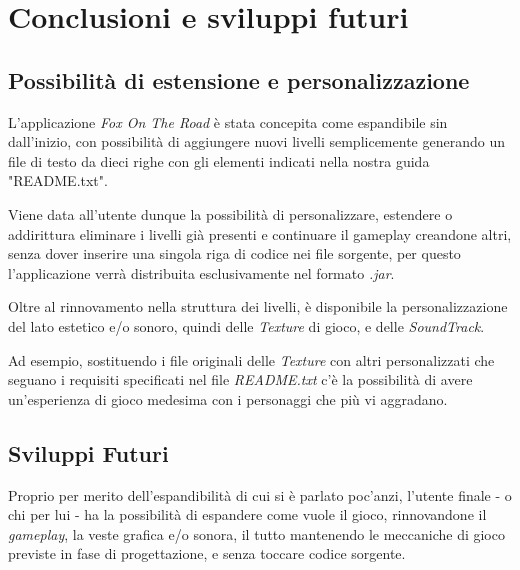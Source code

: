 \documentclass[12pt,a4paper]{report}
\begin{document}
\chapter{Conclusioni e sviluppi futuri}\label{ch:conc-svil-fut}

\section{Possibilità di estensione e personalizzazione}
L'applicazione \emph{Fox On The Road} è stata concepita come espandibile sin dall'inizio, con possibilità di aggiungere nuovi livelli semplicemente generando un file di testo da dieci righe con gli elementi indicati nella nostra guida "README.txt".

Viene data all'utente dunque la possibilità di personalizzare, estendere o addirittura eliminare i livelli già presenti e continuare il gameplay creandone altri, senza dover inserire una singola riga di codice nei file sorgente, per questo l'applicazione verrà distribuita esclusivamente nel formato \emph{.jar}.

Oltre al rinnovamento nella struttura dei livelli, è disponibile la personalizzazione del lato estetico e/o sonoro, quindi delle \emph{Texture} di gioco, e delle \emph{SoundTrack}.

Ad esempio, sostituendo i file originali delle \emph{Texture} con altri personalizzati che seguano i requisiti specificati nel file \emph{README.txt} c'è la possibilità di avere un'esperienza di gioco medesima con i personaggi che più vi aggradano.


\section{Sviluppi Futuri}
Proprio per merito dell'espandibilità di cui si è parlato poc'anzi, l'utente finale - o chi per lui - ha la possibilità di espandere come vuole il gioco, rinnovandone il \emph{gameplay}, la veste grafica e/o sonora, il tutto mantenendo le meccaniche di gioco previste in fase di progettazione, e senza toccare codice sorgente.


\end{document}
